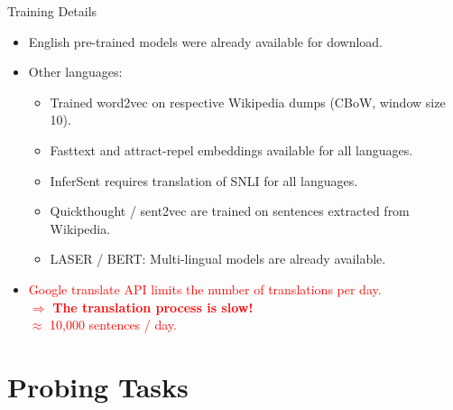 \documentclass[accentcolor=tud1a,colorbacktitle,inverttitle,landscape,german,presentation,t]{tudbeamer}
\begin{document}
\begin{frame}{Training Details}{}
	\vspace*{-4mm}
	\begin{itemize}\setlength\itemsep{1em}
		\item English pre-trained models were already available for download.
		\item Other languages:
		\begin{itemize}
			\item Trained word2vec on respective Wikipedia dumps (CBoW, window size 10).
			\item Fasttext and attract-repel embeddings available for all languages.
			\item InferSent requires translation of SNLI for all languages.
			\item Quickthought / sent2vec are trained on sentences extracted from Wikipedia.
			\item LASER / BERT: Multi-lingual models are already available.
		\end{itemize}
		\item \textcolor{red}{Google translate API limits the number of translations per day. \\
			$\Rightarrow$ \textbf{The translation process is slow!} \\[3mm]
			$\approx$ 10,000 sentences / day.}
	\end{itemize}
\end{frame}


\section{Probing Tasks}
\end{document}
